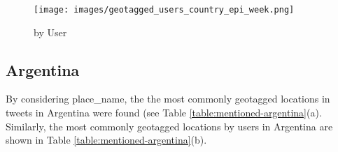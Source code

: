 \begin{figure}[H]%
    \centering
    \texttt{[image: images/geotagged\_users\_country\_epi\_week.png]}
    \caption{by User}
    \label{fig:geotagged-countries-users-epi-week}
\end{figure}


\subsection{Argentina}

By considering {\selectfont place\_name}, the the most commonly geotagged locations in tweets in Argentina were found (see Table \ref{table:mentioned-argentina}(a). Similarly, the most commonly geotagged locations by users in Argentina are shown in Table \ref{table:mentioned-argentina}(b).

